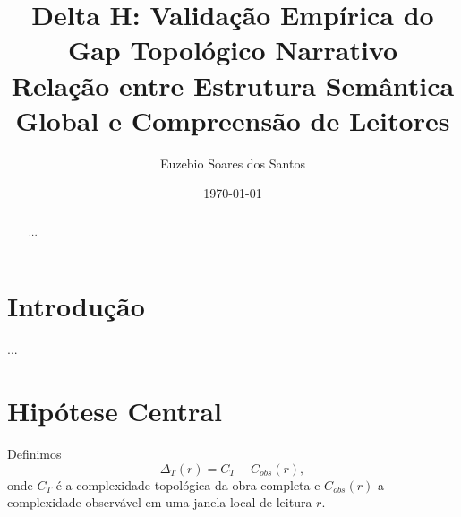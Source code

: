 \documentclass[11pt,a4paper]{article}
\title{Delta H: Validação Empírica do Gap Topológico Narrativo\\
\large Relação entre Estrutura Semântica Global e Compreensão de Leitores}
\author{Euzebio Soares dos Santos}
\date{\today}
\newcommand{\dT}{\Delta_{T}}
\begin{document}
\maketitle

\begin{abstract}
...
\end{abstract}

\section{Introdução}
...

\section{Hipótese Central}
Definimos
\[
    \dT(r) = C_T - C_{obs}(r),
\]
onde $C_T$ é a complexidade topológica da obra completa e $C_{obs}(r)$
a complexidade observável em uma janela local de leitura $r$.
\end{document}
